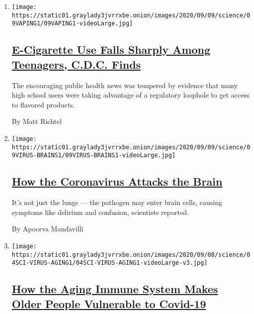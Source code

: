 \begin{enumerate}
\def\labelenumi{\arabic{enumi}.}
\item
  \texttt{[image: https://static01.graylady3jvrrxbe.onion/images/2020/09/09/science/09VAPING1/09VAPING1-videoLarge.jpg]}

  \hypertarget{e-cigarette-use-falls-sharply-among-teenagers-cdc-finds}{%
  \subsection{\texorpdfstring{\href{/2020/09/09/health/vaping-use-drops-teenagers.html}{E-Cigarette
  Use Falls Sharply Among Teenagers, C.D.C.
  Finds}}{E-Cigarette Use Falls Sharply Among Teenagers, C.D.C. Finds}}\label{e-cigarette-use-falls-sharply-among-teenagers-cdc-finds}}

  The encouraging public health news was tempered by evidence that many
  high school users were taking advantage of a regulatory loophole to
  get access to flavored products.

  By Matt Richtel
\item
  \texttt{[image: https://static01.graylady3jvrrxbe.onion/images/2020/09/09/science/09VIRUS-BRAINS1/09VIRUS-BRAINS1-videoLarge.jpg]}

  \hypertarget{how-the-coronavirus-attacks-the-brain}{%
  \subsection{\texorpdfstring{\href{/2020/09/09/health/coronavirus-brain.html}{How
  the Coronavirus Attacks the
  Brain}}{How the Coronavirus Attacks the Brain}}\label{how-the-coronavirus-attacks-the-brain}}

  It's not just the lungs --- the pathogen may enter brain cells,
  causing symptoms like delirium and confusion, scientists reported.

  By Apoorva Mandavilli
\item
  \texttt{[image: https://static01.graylady3jvrrxbe.onion/images/2020/09/08/science/04SCI-VIRUS-AGING1/04SCI-VIRUS-AGING1-videoLarge-v3.jpg]}

  \hypertarget{how-the-aging-immune-system-makes-older-people-vulnerable-to-covid-19}{%
  \subsection{\texorpdfstring{\href{/2020/09/08/health/covid-aging-immune-system.html}{How
  the Aging Immune System Makes Older People Vulnerable to
  Covid-19}}{How the Aging Immune System Makes Older People Vulnerable to Covid-19}}\label{how-the-aging-immune-system-makes-older-people-vulnerable-to-covid-19}}


\end{enumerate}

